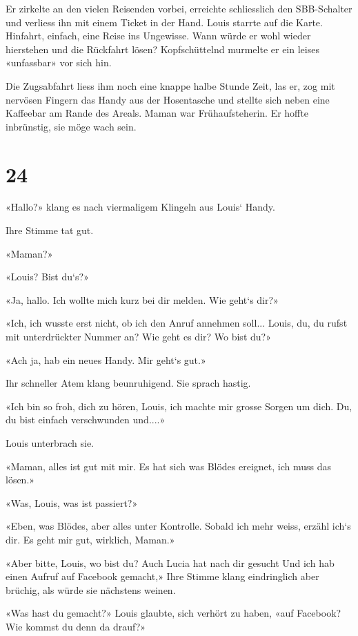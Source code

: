 Er zirkelte an den vielen Reisenden vorbei, erreichte schliesslich den
SBB-Schalter und verliess ihn mit einem Ticket in der Hand. Louis
starrte auf die Karte. Hinfahrt, einfach, eine Reise ins Ungewisse. Wann
würde er wohl wieder hierstehen und die Rückfahrt lösen? Kopfschüttelnd
murmelte er ein leises «unfassbar» vor sich hin.

Die Zugsabfahrt liess ihm noch eine knappe halbe Stunde Zeit, las er,
zog mit nervösen Fingern das Handy aus der Hosentasche und stellte sich
neben eine Kaffeebar am Rande des Areals. Maman war Frühaufsteherin. Er
hoffte inbrünstig, sie möge wach sein.

\chapter{24}\label{section-23}

«Hallo?» klang es nach viermaligem Klingeln aus Louis` Handy.

Ihre Stimme tat gut.

«Maman?»

«Louis? Bist du`s?»

«Ja, hallo. Ich wollte mich kurz bei dir melden. Wie geht`s dir?»

«Ich, ich wusste erst nicht, ob ich den Anruf annehmen soll... Louis,
du, du rufst mit unterdrückter Nummer an? Wie geht es dir? Wo bist du?»

«Ach ja, hab ein neues Handy. Mir geht`s gut.»

Ihr schneller Atem klang beunruhigend. Sie sprach hastig.

«Ich bin so froh, dich zu hören, Louis, ich machte mir grosse Sorgen um
dich. Du, du bist einfach verschwunden und....»

Louis unterbrach sie.

«Maman, alles ist gut mit mir. Es hat sich was Blödes ereignet, ich muss
das lösen.»

«Was, Louis, was ist passiert?»

«Eben, was Blödes, aber alles unter Kontrolle. Sobald ich mehr weiss,
erzähl ich`s dir. Es geht mir gut, wirklich, Maman.»

«Aber bitte, Louis, wo bist du? Auch Lucia hat nach dir gesucht Und ich
hab einen Aufruf auf Facebook gemacht,» Ihre Stimme klang eindringlich
aber brüchig, als würde sie nächstens weinen.

«Was hast du gemacht?» Louis glaubte, sich verhört zu haben, «auf
Facebook? Wie kommst du denn da drauf?»

